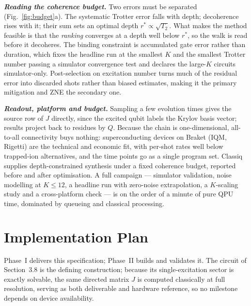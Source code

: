 \documentclass[10pt,a4paper]{article}
\newcommand{\lead}[1]{\textbf{\textit{#1}}}
\begin{document}
\lead{Reading the coherence budget.} Two errors must be separated (Fig.~\ref{fig:budget}a). The
systematic Trotter error falls with depth; decoherence rises with it; their sum sets an optimal depth
$r^{*}\propto\sqrt{T_2}$. What makes the method feasible is that the \emph{ranking} converges at a
depth well below $r^{*}$, so the walk is read before it decoheres. The binding constraint is
accumulated gate error rather than duration, which fixes the headline run at the smallest $K$ and the
smallest Trotter number passing a simulator convergence test and declares the large-$K$ circuits
simulator-only. Post-selection on excitation number turns much of the residual error into discarded
shots rather than biased estimates, making it the primary mitigation and ZNE the secondary one.

\lead{Readout, platform and budget.} Sampling a few evolution times gives the source row of $J$
directly, since the excited qubit labels the Krylov basis vector; results project back to residues by
$Q$. Because the chain is one-dimensional, all-to-all connectivity buys nothing: superconducting
devices on Braket (IQM, Rigetti) are the technical and economic fit, with per-shot rates well below
trapped-ion alternatives, and the time points go as a single program set. Classiq supplies
depth-constrained synthesis under a fixed coherence budget, reported before and after optimisation. A
full campaign --- simulator validation, noise modelling at $K \le 12$, a headline run with zero-noise
extrapolation, a $K$-scaling study and a cross-platform check --- is on the order of a minute of pure
QPU time, dominated by queueing and classical processing.

\section{Implementation Plan}

Phase~I delivers this specification; Phase~II builds and validates it. The circuit of Section~3.8 is
the defining construction; because its single-excitation sector is exactly solvable, the same directed
matrix $J$ is computed classically at full resolution, serving as both deliverable and hardware
reference, so no milestone depends on device availability.
\end{document}
